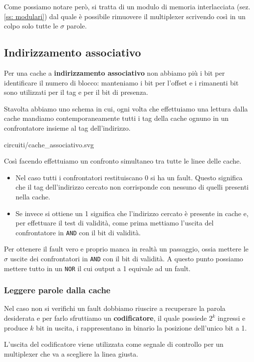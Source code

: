 Come possiamo notare però, si tratta di un modulo di memoria interlacciata (sez. \ref{ss: modulari})
dal quale è possibile rimuovere il multiplexer scrivendo così in un colpo solo tutte le $\sigma$
parole.

\subsection{Indirizzamento associativo}
Per una cache a \textbf{indirizzamento associativo} non abbiamo più i bit per identificare il numero
di blocco: manteniamo i bit per l'offset e i rimanenti bit sono utilizzati per il tag e per il bit
di presenza.

Stavolta abbiamo uno schema in cui, ogni volta che effettuiamo una lettura dalla cache mandiamo
contemporaneamente tutti i tag della cache ognuno in un confrontatore insieme al tag dell'indirizzo.
\begin{center}
	 {circuiti/cache_associativo.svg}
\end{center}
Così facendo effettuiamo un confronto simultaneo tra tutte le linee delle cache.
\begin{itemize}
	\item Nel caso tutti i confrontatori restituiscano 0 si ha un fault. Questo significa che
	      il tag dell'indirizzo cercato non corrisponde con nessuno di quelli presenti nella cache.
	\item Se invece si ottiene un 1 significa che l'indirizzo cercato è presente in cache e, per
	      effettuare il test di validità, come prima mettiamo l'uscita del confrontatore in
	      \verb|AND| con il bit di validità.
\end{itemize}
Per ottenere il fault vero e proprio manca in realtà un passaggio, ossia mettere le $\sigma$ uscite
dei confrontatori in \verb|AND| con il bit di validità. A questo punto possiamo mettere tutto in un
\verb|NOR| il cui output a 1 equivale ad un fault.

\subsubsection{Leggere parole dalla cache}
Nel caso non si verifichi un fault dobbiamo riuscire a recuperare la parola desiderata e per farlo
sfruttiamo un \textbf{codificatore}, il quale possiede $2^k$ ingressi e produce $k$ bit in uscita,
i rappresentano in binario la posizione dell'unico bit a 1.
\begin{center}
	
\end{center}
L'uscita del codificatore viene utilizzata come segnale di controllo per un multiplexer che va a
scegliere la linea giusta.

